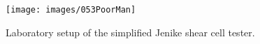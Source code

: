 \begin{figure}[!htb]
\centering
\texttt{[image: images/053PoorMan]}
\caption[SJSCT]{Laboratory setup of the simplified Jenike shear cell
tester.}
\label{fig:053PoorMan}
\end{figure}
